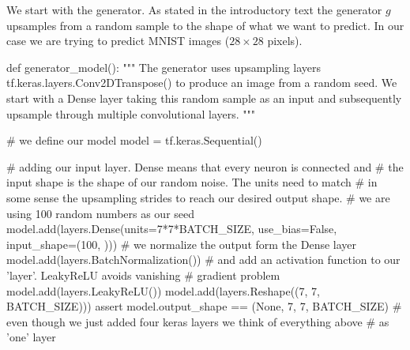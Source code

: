 \documentclass[%
oneside,                 %
final,                   %
10pt]{article}
\begin{document}
We start with the generator. As stated in the introductory text the generator
$g$ upsamples from a random sample to the shape of what we want to predict. In
our case we are trying to predict MNIST images ($28\times 28$ pixels).




























































\bpycod
def generator_model():
    """
    The generator uses upsampling layers tf.keras.layers.Conv2DTranspose() to
    produce an image from a random seed. We start with a Dense layer taking this
    random sample as an input and subsequently upsample through multiple
    convolutional layers.
    """

    # we define our model
    model = tf.keras.Sequential()


    # adding our input layer. Dense means that every neuron is connected and
    # the input shape is the shape of our random noise. The units need to match
    # in some sense the upsampling strides to reach our desired output shape.
    # we are using 100 random numbers as our seed
    model.add(layers.Dense(units=7*7*BATCH_SIZE,
                           use_bias=False,
                           input_shape=(100, )))
    # we normalize the output form the Dense layer
    model.add(layers.BatchNormalization())
    # and add an activation function to our 'layer'. LeakyReLU avoids vanishing
    # gradient problem
    model.add(layers.LeakyReLU())
    model.add(layers.Reshape((7, 7, BATCH_SIZE)))
    assert model.output_shape == (None, 7, 7, BATCH_SIZE)
    # even though we just added four keras layers we think of everything above
    # as 'one' layer
\end{document}
